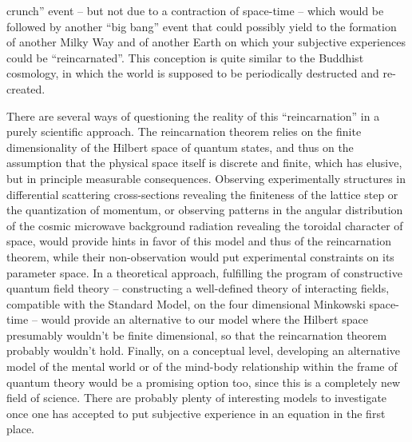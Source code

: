 crunch'' event -- but not due to a contraction of space-time -- which would be followed by another ``big bang'' event that could possibly yield to the formation of another Milky Way and of another Earth on which your subjective experiences could be ``reincarnated''. This conception is quite similar to the Buddhist cosmology, in which the world is supposed to be periodically destructed and re-created.

There are several ways of questioning the reality of this ``reincarnation'' in a purely scientific approach. The reincarnation theorem relies on the finite dimensionality of the Hilbert space of quantum states, and thus on the assumption that the physical space itself is discrete and finite, which has elusive, but in principle measurable consequences. Observing experimentally structures in differential scattering cross-sections revealing the finiteness of the lattice step or the quantization of momentum, or observing patterns in the angular distribution of the cosmic microwave background radiation revealing the toroidal character of space, would provide hints in favor of this model and thus of the reincarnation theorem, while their non-observation would put experimental constraints on its parameter space. In a theoretical approach, fulfilling the program of constructive quantum field theory -- constructing a well-defined theory of interacting fields, compatible with the Standard Model, on the four dimensional Minkowski space-time -- would provide an alternative to our model where the Hilbert space presumably wouldn't be finite dimensional, so that the reincarnation theorem probably wouldn't hold. Finally, on a conceptual level, developing an alternative model of the mental world or of the mind-body relationship within the frame of quantum theory would be a promising option too, since this is a completely new field of science. There are probably plenty of interesting models to investigate once one has accepted to put subjective experience in an equation in the first place.





